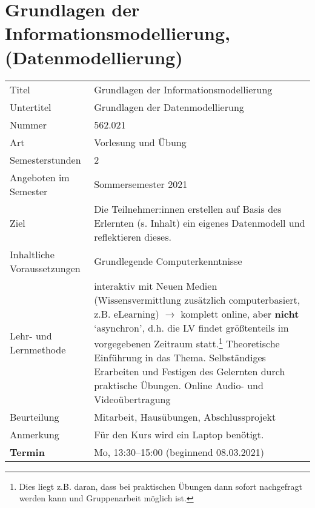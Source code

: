 \section{Grundlagen der Informationsmodellierung, (Datenmodellierung)}


\begin{tabular}{l|l}
Titel & Grundlagen der Informationsmodellierung \\
Untertitel & Grundlagen der Datenmodellierung \\
Nummer & 562.021 \\
Art & Vorlesung und Übung \\
Semesterstunden & 2 \\
Angeboten im Semester & Sommersemester 2021 \\ \hline 
Ziel & Die Teilnehmer:innen erstellen auf Basis des Erlernten (s. Inhalt) ein eigenes Datenmodell und reflektieren dieses. \\
Inhaltliche Voraussetzungen & Grundlegende Computerkenntnisse \\
Lehr- und Lernmethode & interaktiv mit Neuen Medien (Wissensvermittlung zusätzlich computerbasiert, z.B. eLearning) $\to$ komplett online, aber \textbf{nicht} `asynchron', d.h. die LV findet größtenteils im vorgegebenen Zeitraum statt.\footnote{Dies liegt z.B. daran, dass bei praktischen Übungen dann sofort nachgefragt werden kann und Gruppenarbeit möglich ist.} \newline 
Theoretische Einführung in das Thema. \newline 
Selbständiges Erarbeiten und Festigen des Gelernten durch praktische Übungen. \newline 
Online Audio- und Videoübertragung \\
Beurteilung & Mitarbeit, Hausübungen, Abschlussprojekt \\
Anmerkung & Für den Kurs wird ein Laptop benötigt. \\
\textbf{Termin} & Mo, 13:30--15:00 (beginnend 08.03.2021)
\end{tabular}


